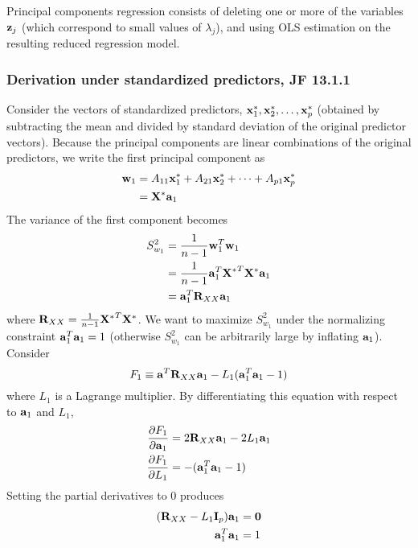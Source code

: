 Principal components regression consists of deleting one or more of the variables $\mathbf{z}_j$ (which correspond to small values of $\lambda_j$), and using OLS estimation on the resulting reduced regression model.

\subsubsection*{Derivation under standardized predictors, JF 13.1.1}
Consider the vectors of standardized predictors, $\mathbf{x}^*_1,\mathbf{x}^*_2, \dots, \mathbf{x}^*_p$ (obtained by subtracting the mean and divided by standard deviation of the original predictor vectors).
Because the principal components are linear combinations of the original predictors, we write the first principal component as
$$
\begin{aligned}
\mathbf{w}_1 &= A_{11} \mathbf{x}^*_1 + A_{21} \mathbf{x}^*_2 + \cdots + A_{p1} \mathbf{x}^*_p\\
&= \mathbf{X}^* \mathbf{a}_1\\
\end{aligned}
$$
The variance of the first component becomes
$$
\begin{aligned}
S_{w_1}^2 &= \frac{1}{n - 1} \mathbf{w}_1^T \mathbf{w}_1 \\
&= \frac{1}{n - 1} \mathbf{a}_1 ^T {\mathbf{X}^*}^T \mathbf{X}^* \mathbf{a}_1\\
&= \mathbf{a}_1^T \mathbf{R}_{XX}\mathbf{a}_1\\
\end{aligned}
$$
where $\mathbf{R}_{XX} = \frac{1}{n - 1}  {\mathbf{X}^*}^T \mathbf{X}^*$.
We want to maximize $S_{w_1}^2$ under the normalizing constraint $\mathbf{a}_1^T \mathbf{a}_1 = 1$ (otherwise $S_{w_1}^2$ can be arbitrarily large by inflating $\mathbf{a}_1$).
Consider
$$
F_1 \equiv \mathbf{a}^T \mathbf{R}_{XX} \mathbf{a}_1 - L_1(\mathbf{a}_1^T \mathbf{a}_1 - 1)
$$
where $L_1$ is a Lagrange multiplier.  By differentiating this equation with respect to $\mathbf{a}_1$ and $L_1$,
$$
\begin{aligned}
	\frac{\partial F_1}{\partial \mathbf{a}_1} &= 2 \mathbf{R}_{XX}\mathbf{a}_1 - 2L_1 \mathbf{a}_1\\
	\frac{\partial F_1}{\partial L_1} &= -(\mathbf{a}_1 ^T \mathbf{a}_1 - 1)\\	
\end{aligned}
$$
Setting the partial derivatives to 0 produces
$$
\begin{aligned}
	(\mathbf{R}_{XX} - L_1 \mathbf{I}_p) \mathbf{a}_1 &= \mathbf{0}\\
	\mathbf{a}_1 ^T \mathbf{a}_1 &= 1\\	
\end{aligned}
$$
